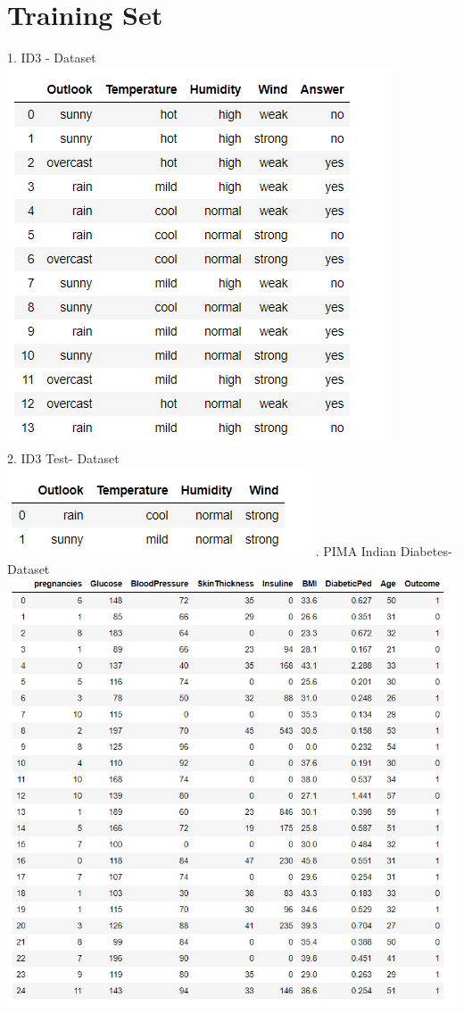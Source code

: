 \documentclass[a4paper]{article}
\begin{document}
\newpage
	\section{Training Set}
	1. ID3 - Dataset\\
	\includegraphics[scale=1.3]{id3.png}\\
	2. ID3 Test- Dataset\\
	\includegraphics[scale=1.3]{id3_test_1.png}
	. PIMA Indian Diabetes- Dataset
	\includegraphics[scale=1.0]{pima_indian_diabetes.png}
\newpage
\end{document}
